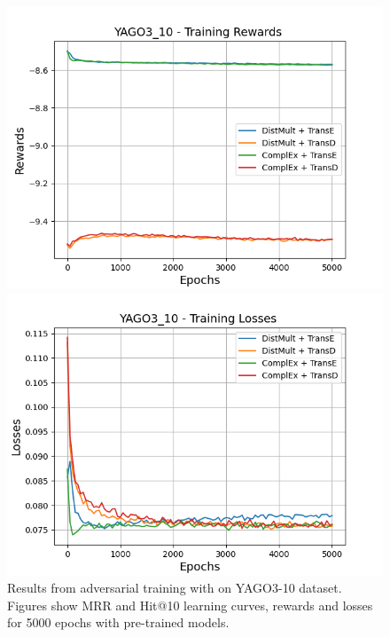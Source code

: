 \begin{figure}[H]
    \begin{minipage}{.45\textwidth}
      \centering
      \includegraphics[width=0.9\linewidth]{figures/results/gan_train/pretrained/uncertainty/max_distribution/entropy/yago3_10/5k_epochs/uncertainty_yago3_10_rew.png}
    \end{minipage}%
     \begin{minipage}{.45\textwidth}
      \centering
      \includegraphics[width=0.9\linewidth]{figures/results/gan_train/pretrained/uncertainty/max_distribution/entropy/yago3_10/5k_epochs/uncertainty_yago3_10_losses.png}
    \end{minipage}%
    \caption{Results from adversarial training with \ussoftmax on \textsc{YAGO3-10} dataset.
    Figures show MRR and Hit@10 learning curves, rewards and losses for 5000 epochs with pre-trained models.}
    \label{fig:gan_train_pretrained_ussoftmax_yago3_10}
\end{figure}